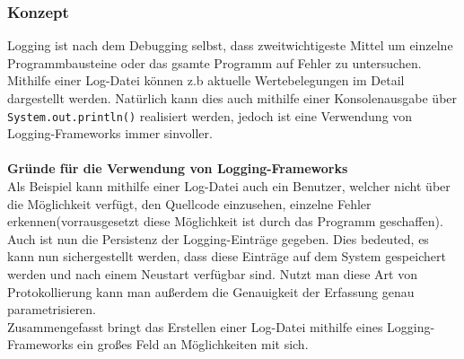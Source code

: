 \subsubsection{Konzept}\label{sssec:logOverview}
Logging ist nach dem Debugging selbst, dass zweitwichtigeste Mittel um einzelne Programmbausteine oder das gsamte Programm auf Fehler zu untersuchen.
Mithilfe einer Log-Datei können z.b aktuelle Wertebelegungen im Detail dargestellt werden.
Natürlich kann dies auch mithilfe einer Konsolenausgabe über \lstinline[style=java]{System.out.println()} realisiert werden, jedoch ist eine Verwendung von Logging-Frameworks immer sinvoller.\\\\
\textbf{Gründe für die Verwendung von Logging-Frameworks}\\
Als Beispiel kann mithilfe einer Log-Datei auch ein Benutzer, welcher nicht über die Möglichkeit verfügt, den Quellcode einzusehen, einzelne Fehler erkennen(vorrausgesetzt diese Möglichkeit ist durch das Programm geschaffen).
Auch ist nun die Persistenz der Logging-Einträge gegeben.
Dies bedeuted, es kann nun sichergestellt werden, dass diese Einträge auf dem System gespeichert werden und nach einem Neustart verfügbar sind.
Nutzt man diese Art von Protokollierung kann man außerdem die Genauigkeit der Erfassung genau parametrisieren.\\
Zusammengefasst bringt das Erstellen einer Log-Datei mithilfe eines Logging-Frameworks ein großes Feld an Möglichkeiten mit sich.\\\\
